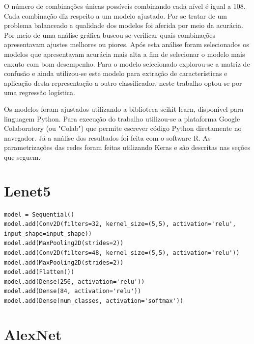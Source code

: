 \documentclass[
	12pt,				%
	openright,			%
	twoside,			%
	a4paper,			%
	english,			%
	brazil,				%
	svgnames
	]{abntex2}\usepackage[]{graphicx}\usepackage[]{color}
\begin{document}
O número de combinações únicas possíveis combinando cada nível é igual a 108. Cada combinação diz respeito a um modelo ajustado. Por se tratar de um problema balanceado a qualidade dos modelos foi aferida por meio da acurácia. Por meio de uma análise gráfica buscou-se verificar quais combinações apresentavam ajustes melhores ou piores. Após esta análise foram selecionados os modelos que apresentavam acurácia mais alta a fim de selecionar o modelo mais enxuto com bom desempenho. Para o modelo selecionado explorou-se a matriz de confusão e ainda utilizou-se este modelo para extração de características e aplicação desta representação a outro classificador, neste trabalho optou-se por uma regressão logística.

Os modelos foram ajustados utilizando a biblioteca scikit-learn, disponível para linguagem Python. Para execução do trabalho utilizou-se a plataforma Google Colaboratory (ou "Colab") que permite escrever código Python diretamente no navegador. Já a análise dos resultados foi feita com o software R. As parametrizações das redes foram feitas utilizando Keras e são descritas nas seções que seguem.

\pagebreak

\section{Lenet5}

\begin{lstlisting}
model = Sequential()
model.add(Conv2D(filters=32, kernel_size=(5,5), activation='relu', input_shape=input_shape))
model.add(MaxPooling2D(strides=2))
model.add(Conv2D(filters=48, kernel_size=(5,5), activation='relu'))
model.add(MaxPooling2D(strides=2))
model.add(Flatten())
model.add(Dense(256, activation='relu'))
model.add(Dense(84, activation='relu'))
model.add(Dense(num_classes, activation='softmax'))

\end{lstlisting}

\section{AlexNet}
\end{document}
